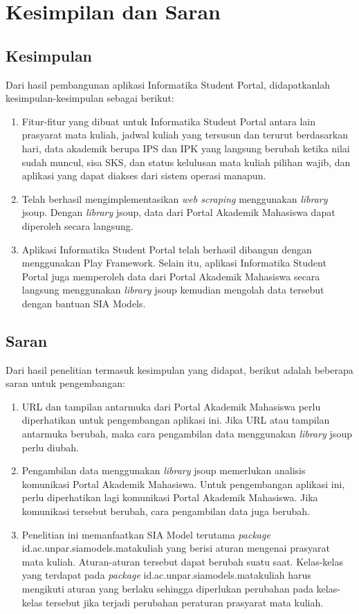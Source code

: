 \chapter{Kesimpilan dan Saran}
\label{chap:kesimpulan_saran}

\section{Kesimpulan}
\label{sec:kesimpulan}
Dari hasil pembangunan aplikasi Informatika Student Portal, didapatkanlah kesimpulan-kesimpulan sebagai berikut:
		\begin{enumerate}
			\item Fitur-fitur yang dibuat untuk Informatika Student Portal antara lain prasyarat mata kuliah, jadwal kuliah yang tersusun dan terurut berdasarkan hari, data akademik berupa IPS dan IPK yang langsung berubah ketika nilai sudah muncul, sisa SKS, dan status kelulusan mata kuliah pilihan wajib, dan aplikasi yang dapat diakses dari sistem operasi manapun.
			\item Telah berhasil mengimplementasikan \textit{web scraping} menggunakan \textit{library} jsoup. Dengan \textit{library} jsoup, data dari Portal Akademik Mahasiswa dapat diperoleh secara langsung.
			\item Aplikasi Informatika Student Portal telah berhasil dibangun dengan menggunakan Play Framework. Selain itu, aplikasi Informatika Student Portal juga memperoleh data dari Portal Akademik Mahasiswa secara langsung menggunakan \textit{library} jsoup kemudian mengolah data tersebut dengan bantuan SIA Models. 
		\end{enumerate}

\section{Saran}
\label{sec:saran}
Dari hasil penelitian termasuk kesimpulan yang didapat, berikut adalah beberapa saran untuk pengembangan:
	\begin{enumerate}
		\item URL dan tampilan antarmuka dari Portal Akademik Mahasiswa perlu diperhatikan untuk pengembangan aplikasi ini. Jika URL atau tampilan antarmuka berubah, maka cara pengambilan data menggunakan \textit{library} jsoup perlu diubah.
		\item Pengambilan data menggunakan \textit{library} jsoup memerlukan analisis komunikasi Portal Akademik Mahasiswa. Untuk pengembangan aplikasi ini, perlu diperhatikan lagi komunikasi Portal Akademik Mahasiswa. Jika komunikasi tersebut berubah, cara pengambilan data juga berubah.
		\item Penelitian ini memanfaatkan SIA Model terutama \textit{package} id.ac.unpar.siamodels.matakuliah yang berisi aturan mengenai prasyarat mata kuliah. Aturan-aturan tersebut dapat berubah suatu saat. Kelas-kelas yang terdapat pada \textit{package} id.ac.unpar.siamodels.matakuliah harus mengikuti aturan yang berlaku sehingga diperlukan perubahan pada kelas-kelas tersebut jika terjadi perubahan peraturan prasyarat mata kuliah.
	\end{enumerate}